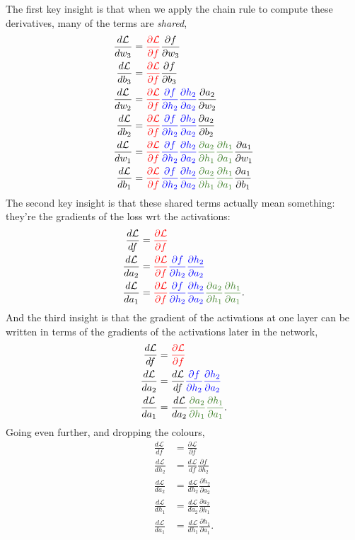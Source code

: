 \documentclass{article}
\newcommand{\dd}[2][]{\frac{\partial #1}{\partial #2}}
\newcommand{\dt}[2][]{\frac{d #1}{d #2}}
\newcommand{\dL}{\dt[\L]}
\renewcommand{\L}{\mathcal{L}}
\begin{document}
The first key insight is that when we apply the chain rule to compute these derivatives, many of the terms are \textit{shared},
\newcommand{\cola}{\textcolor{red}}
\newcommand{\colb}{\textcolor{blue}}
\newcommand{\colc}{\textcolor{OliveGreen}}
\begin{subequations}
\begin{align}
  \dL{w_3} &= \cola{\dd[\L]{f}} \dd[f]{w_3}\\
  \dL{b_3} &= \cola{\dd[\L]{f}} \dd[f]{b_3}\\
  \dL{w_2} &= \cola{\dd[\L]{f}} \colb{\dd[f]{h_2} \dd[h_2]{a_2}} \dd[a_2]{w_2}\\
  \dL{b_2} &= \cola{\dd[\L]{f}} \colb{\dd[f]{h_2} \dd[h_2]{a_2}} \dd[a_2]{b_2}\\
  \dL{w_1} &= \cola{\dd[\L]{f}} \colb{\dd[f]{h_2} \dd[h_2]{a_2}} \colc{\dd[a_2]{h_1} \dd[h_1]{a_1}} \dd[a_1]{w_1}\\
  \dL{b_1} &= \cola{\dd[\L]{f}} \colb{\dd[f]{h_2} \dd[h_2]{a_2}} \colc{\dd[a_2]{h_1} \dd[h_1]{a_1}} \dd[a_1]{b_1}
\end{align}
\end{subequations}
The second key insight is that these shared terms actually mean something: they're the gradients of the loss wrt the activations:
\begin{subequations}
\begin{align}
  \dL{f} &= \cola{\dd[\L]{f}}\\
  \dL{a_2} &= \cola{\dd[\L]{f}} \colb{\dd[f]{h_2} \dd[h_2]{a_2}}\\
  \dL{a_1} &= \cola{\dd[\L]{f}} \colb{\dd[f]{h_2} \dd[h_2]{a_2}} \colc{\dd[a_2]{h_1} \dd[h_1]{a_1}}.
\end{align}
\end{subequations}
And the third insight is that the gradient of the activations at one layer can be written in terms of the gradients of the activations later in the network,
\begin{subequations}
\begin{align}
  \dL{f} &= \cola{\dd[\L]{f}}\\
  \dL{a_2} &= \dL{f} \colb{\dd[f]{h_2} \dd[h_2]{a_2}}\\
  \dL{a_1} &= \dL{a_2} \colc{\dd[a_2]{h_1} \dd[h_1]{a_1}}.
\end{align}
\end{subequations}
Going even further, and dropping the colours,
\begin{subequations}
\begin{align}
  \dL{f} &= \dd[\L]{f}\\
  \dL{h_2} &= \dL{f} \dd[f]{h_2}\\
  \dL{a_2} &= \dL{h_2} \dd[h_2]{a_2}\\
  \dL{h_1} &= \dL{a_2} \dd[a_2]{h_1}\\
  \dL{a_1} &= \dL{h_1} \dd[h_1]{a_1}.
\end{align}
\end{subequations}
\end{document}
